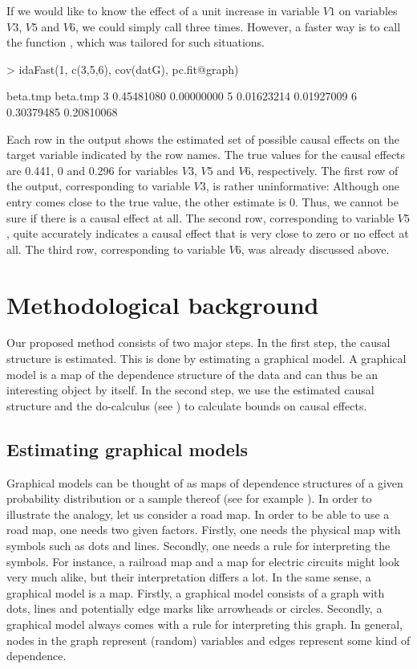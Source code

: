 \documentclass[article]{jss}
\begin{document}
If we would like to know the effect of a unit increase in variable $V1$ on
variables $V3$, $V5$ and $V6$, we could simply call  three
times. However, a faster way is to call the function , which
was tailored for such situations. 

\begin{Schunk}
\begin{Sinput}
> idaFast(1, c(3,5,6), cov(datG), pc.fit@graph)
\end{Sinput}
\begin{Soutput}
    beta.tmp   beta.tmp
3 0.45481080 0.00000000
5 0.01623214 0.01927009
6 0.30379485 0.20810068
\end{Soutput}
\end{Schunk}

Each row in the output shows the estimated set of possible causal
effects on the target variable indicated by the row names.  The true
values for the causal effects are 0.441, 0 and 0.296 for variables $V3$,
$V5$ and $V6$, respectively. The first row of the output,
corresponding to variable $V3$, is rather uninformative: Although one entry
comes close to the true value, the other estimate is 0. Thus, we
cannot be sure if there is a causal effect at all. The second row,
corresponding to variable $V5$, quite accurately indicates a causal
effect that is very close to zero or no effect at all. The third row,
corresponding to variable $V6$, was already discussed above.

\section{Methodological background}
Our proposed method consists of two major steps. In the first step, the
causal structure is estimated. This is done by estimating a graphical
model. A graphical model is a map of the dependence structure of the data
and can thus be an interesting object by itself. In the second step, we use
the estimated causal structure and the do-calculus (see \cite{Pearl00}) to calculate
bounds on causal effects.

\subsection{Estimating graphical models} \label{sec:gm} 
Graphical models
can be thought of as maps of dependence structures of a given probability
distribution or a sample thereof (see for example \cite{lauritzen}). In
order to illustrate the analogy, let us consider a road map. In order to be
able to use a road map, one needs two given factors. Firstly, one needs the
physical map with symbols such as dots and lines. Secondly, one needs a
rule for interpreting the symbols. For instance, a railroad map and a map
for electric circuits might look very much alike, but their interpretation
differs a lot. In the same sense, a graphical model is a map. Firstly, a
graphical model consists of a graph with dots, lines and potentially edge
marks like arrowheads or circles. Secondly, a graphical model always comes
with a rule for interpreting this graph. In general, nodes in the graph
represent (random) variables and edges represent some kind of dependence.
\end{document}
